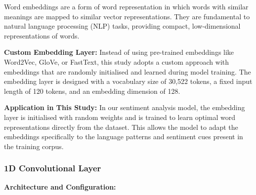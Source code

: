 \documentclass{article}
\begin{document}
Word embeddings are a form of word representation in which words with similar meanings are mapped to similar vector representations. They are fundamental to natural language processing (NLP) tasks, providing compact, low-dimensional representations of words.

\textbf{Custom Embedding Layer:} Instead of using pre-trained embeddings like Word2Vec, GloVe, or FastText, this study adopts a custom approach with embeddings that are randomly initialised and learned during model training. The embedding layer is designed with a vocabulary size of 30,522 tokens, a fixed input length of 120 tokens, and an embedding dimension of 128.

\textbf{Application in This Study:} In our sentiment analysis model, the embedding layer is initialised with random weights and is trained to learn optimal word representations directly from the dataset. This allows the model to adapt the embeddings specifically to the language patterns and sentiment cues present in the training corpus.

\subsubsection{1D Convolutional Layer}

\textbf{Architecture and Configuration:}
\end{document}
